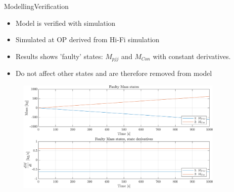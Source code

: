 
\begin{frame}{Modelling}{Verification}
	\begin{itemize}
		\item Model is verified with simulation
		\item Simulated at OP derived from Hi-Fi simulation
		\item Results shows 'faulty' states: $M_{pjj}$ and $M_{Con}$ with constant derivatives.
		\item Do not affect other states and are therefore removed from model
	\end{itemize}
	\begin{figure}[h]
		\centering
		\includegraphics[width=0.9\textwidth]{../Graphics/nonlin_sim_faulty_Mass.png}
		\label{fig:non_lin_sim_faulty_Mass}
	\end{figure}
\end{frame}





